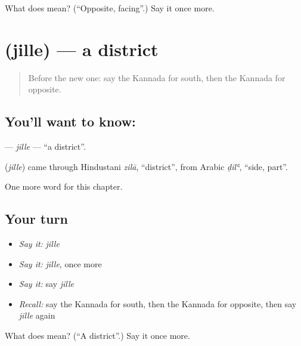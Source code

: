 \begin{tcolorbox}[breakable,colback=teal!4,colframe=teal!35!black,title={Before you move on}]
What does  mean? (\textquotedblleft{}Opposite, facing\textquotedblright{}.) Say it once more.
\end{tcolorbox}
\section[\texorpdfstring{\kn{ಜಿಲ್ಲೆ} (jille)}{ಜಿಲ್ಲೆ (jille)}]{ (jille) — a district}

\label{lesson:KA-C249-jille}



\begin{quote}
Before the new one: say the Kannada for south, then the Kannada for opposite.
\end{quote}

\subsection*{You'll want to know: }
\textbf{} — \emph{jille} — \textquotedblleft{}a district\textquotedblright{}.

\begin{cousinweb}
\textbf{} (\emph{jille}) came through Hindustani \emph{zilā}, \textquotedblleft{}district\textquotedblright{}, from Arabic \emph{ḍilʿ}, \textquotedblleft{}side, part\textquotedblright{}.
\end{cousinweb}

\begin{grammarlens}[title={What you've built}]
One more word for this chapter.
\end{grammarlens}

\subsection*{Your turn}
\begin{itemize}
\raggedright
  \item \emph{Say it:} \emph{jille}
  \item \emph{Say it:} \emph{jille}, once more
  \item \emph{Say it:} say \emph{jille}
  \item \emph{Recall:} say the Kannada for south, then the Kannada for opposite, then say \emph{jille} again
\end{itemize}

\begin{tcolorbox}[breakable,colback=teal!4,colframe=teal!35!black,title={Before you move on}]
What does  mean? (\textquotedblleft{}A district\textquotedblright{}.) Say it once more.
\end{tcolorbox}
